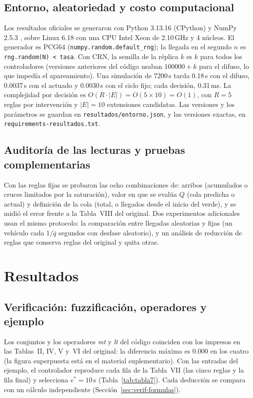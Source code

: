 \documentclass[journal]{IEEEtran}
\newcommand{\qbar}{\bar{q}}   %
\begin{document}
\subsection{Entorno, aleatoriedad y costo computacional}
\label{sec:entorno}
Los resultados oficiales se generaron con Python 3.13.16 (CPython) y NumPy 2.5.3 \cite{Harris2020}, sobre Linux 6.18 con una CPU Intel Xeon de 2.10\,GHz y 4 núcleos. El generador es PCG64 \cite{ONeill2014} (\texttt{numpy.random.default\_rng}); la llegada en el segundo $n$ es \texttt{rng.random(N) < tasa}. Con CRN, la semilla de la réplica $k$ es $k$ para todos los controladores (versiones anteriores del código usaban $100000+k$ para el difuso, lo que impedía el apareamiento). Una simulación de 7200\,s tarda 0.18\,s con el difuso, 0.0037\,s con el actuado y 0.0030\,s con el ciclo fijo; cada decisión, 0.31\,ms. La complejidad por decisión es $O(R\cdot|E|)=O(5\times10)=O(1)$, con $R=5$ reglas por intervención y $|E|=10$ extensiones candidatas. Las versiones y los parámetros se guardan en \texttt{resultados/entorno.json}, y las versiones exactas, en \texttt{requirements-resultados.txt}.

\subsection{Auditoría de las lecturas y pruebas complementarias}
\label{sec:auditoria-met}
Con las reglas fijas se probaron las ocho combinaciones de: arribos (acumulados o cruces limitados por la saturación), valor en que se evalúa $Q$ (cola predicha o actual) y definición de la cola (total, o llegados desde el inicio del verde), y se midió el error frente a la Tabla~VIII del original. Dos experimentos adicionales usan el mismo protocolo: la comparación entre llegadas aleatorias y fijas (un vehículo cada $1/\qbar$ segundos con desfase aleatorio), y un análisis de reducción de reglas que conserva reglas del original y quita otras.

\section{Resultados}
\label{sec:resultados}

\subsection{Verificación: fuzzificación, operadores y ejemplo}
Los conjuntos y los operadores \emph{mt} y \emph{lt} del código coinciden con los impresos en las Tablas~II, IV, V y~VI del original: la diferencia máxima es 0.000 en los cuatro (la figura superpuesta está en el material suplementario). Con las entradas del ejemplo, el controlador reproduce cada fila de la Tabla~VII (las cinco reglas y la fila final) y selecciona $e^*=10$\,s (Tabla~\ref{tab:tabla7}). Cada deducción se compara con un cálculo independiente (Sección~\ref{sec:verif-formulas}).
\end{document}
